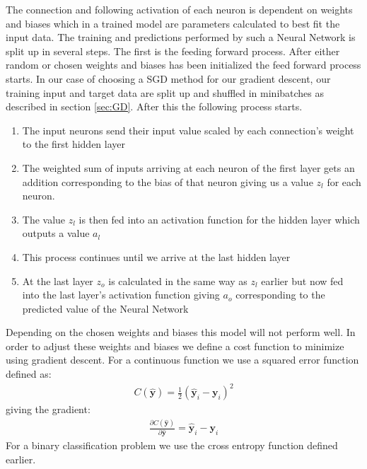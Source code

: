 \documentclass[11pt]{article}
\begin{document}
The connection and following activation of each neuron is dependent on weights and biases which in a trained model are parameters calculated to best fit the input data. The training and predictions performed by such a Neural Network is split up in several steps. The first is the feeding forward process. After either random or chosen weights and biases has been initialized the feed forward process starts. In our case of choosing a SGD method for our gradient descent, our training input and target data are split up and shuffled in minibatches as described in section \ref{sec:GD}. After this the following process starts.
\begin{enumerate}
  \item The input neurons send their input value scaled by each connection's weight to the first hidden layer
  \item The weighted sum of inputs arriving at each neuron of the first layer gets an addition corresponding to the bias of that neuron giving us a value $z_l$ for each neuron.
  \item The value $z_l$ is then fed into an activation function for the hidden layer which outputs a value $a_l$
  \item This process continues until we arrive at the last hidden layer
  \item At the last layer $z_o$ is calculated in the same way as $z_l$ earlier but now fed into the last layer's activation function giving $a_o$ corresponding to the predicted value of the Neural Network
\end{enumerate}
Depending on the chosen weights and biases this model will not perform well. In order to adjust these weights and biases we define a cost function to minimize using gradient descent. For a continuous function we use a squared error function defined as:
\begin{align*}
  C(\hat{\boldsymbol{y}}) = \frac{1}{2}(\hat{\boldsymbol{y}}_i - \boldsymbol{y}_i)^2
\end{align*}
giving the gradient:
\begin{align*}
  \frac{\partial C(\hat{\boldsymbol{y}})}{\partial  \hat{\boldsymbol{y}}} = \hat{\boldsymbol{y}}_i - \boldsymbol{y}_i
\end{align*}
For a binary classification problem we use the cross entropy function defined earlier.
\end{document}
